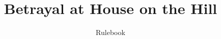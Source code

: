 \documentclass[10pt, a5paper]{article}
\title{Betrayal at House on the Hill}
\author{Rulebook}
\date{}
\begin{document}
\maketitle
\tableofcontents
\pagebreak




% 
% 
\end{document}
